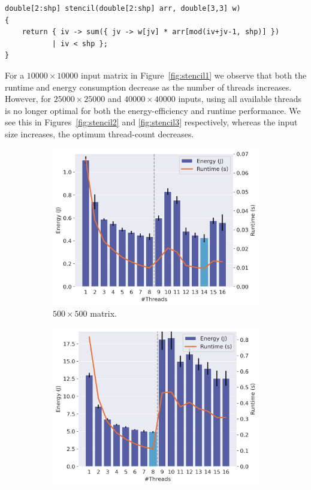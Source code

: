\begin{verbatim}
double[2:shp] stencil(double[2:shp] arr, double[3,3] w)
{
    return { iv -> sum({ jv -> w[jv] * arr[mod(iv+jv-1, shp)] })
           | iv < shp };
}
\end{verbatim}

For a $10000 \times 10000$ input matrix in Figure~\ref{fig:stencil1} we observe that both the runtime and energy consumption decrease as the number of threads increases.
However, for $25000 \times 25000$ and $40000 \times 40000$ inputs, using all available threads is no longer optimal for both the energy-efficiency and runtime performance.
We see this in Figures~\ref{fig:stencil2} and \ref{fig:stencil3} respectively, whereas the input size increases, the optimum thread-count decreases.

\begin{figure}[!ht]
    \centering
    \begin{subfigure}{0.33\linewidth}
        \includegraphics[width=\linewidth]{images/matmul_500.png}
        \caption{$500 \times 500$ matrix.}
        \label{fig:matmul1}
    \end{subfigure}%
    \begin{subfigure}{0.33\linewidth}
        \includegraphics[width=\linewidth]{images/matmul_1000.png}

\end{subfigure}
\end{figure}
